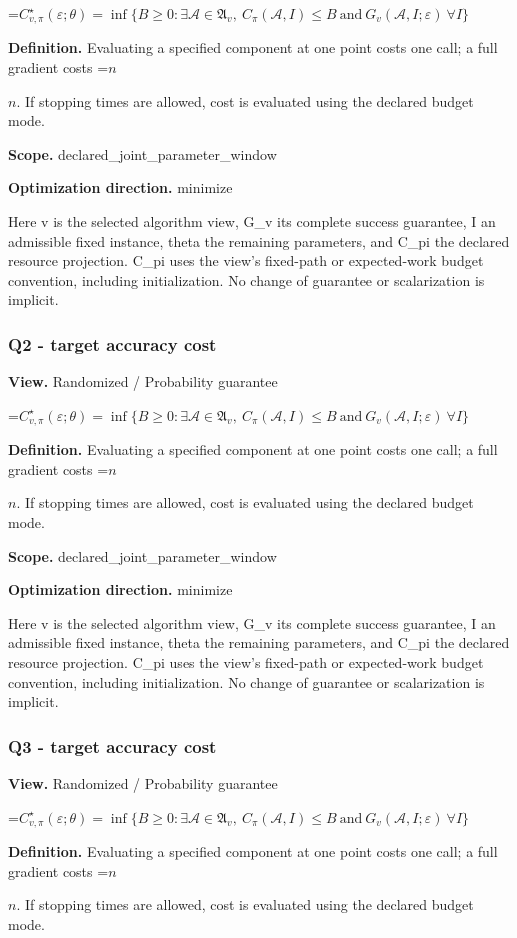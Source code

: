 \documentclass[10pt,a4paper]{article}
\newcommand{\AtlasMath}[1]{\par\begingroup\centering\setbox0=\hbox{$\displaystyle #1$}\ifdim\wd0>1.4\linewidth\typeout{ATLAS WIDE FORMULA: \the\wd0}\fi\ifdim\wd0>\linewidth\resizebox{\linewidth}{!}{\box0}\else\box0\fi\par\endgroup}
\newcommand{\AtlasInlineMath}[1]{\begingroup\setbox0=\hbox{$#1$}\ifdim\wd0>.4\linewidth\endgroup\AtlasMath{#1}\else\endgroup$#1$\fi}
\begin{document}
\AtlasMath{C^\star_{v,\pi}(\varepsilon;\theta)=\inf\{B\ge0:\exists\mathcal A\in\mathfrak A_v,\ C_\pi(\mathcal A,I)\le B\ \text{and}\ G_v(\mathcal A,I;\varepsilon)\ \forall I\}}
\textbf{Definition.} Evaluating a specified component at one point costs one call; a full gradient costs \AtlasInlineMath{n}. If stopping times are allowed, cost is evaluated using the declared budget mode.

\textbf{Scope.} declared\_joint\_parameter\_window

\textbf{Optimization direction.} minimize

Here v is the selected algorithm view, G\_v its complete success guarantee, I an admissible fixed instance, theta the remaining parameters, and C\_pi the declared resource projection. C\_pi uses the view's fixed-path or expected-work budget convention, including initialization. No change of guarantee or scalarization is implicit.

\subsubsection{Q2 - target accuracy cost}
\textbf{View.} Randomized / Probability guarantee

\AtlasMath{C^\star_{v,\pi}(\varepsilon;\theta)=\inf\{B\ge0:\exists\mathcal A\in\mathfrak A_v,\ C_\pi(\mathcal A,I)\le B\ \text{and}\ G_v(\mathcal A,I;\varepsilon)\ \forall I\}}
\textbf{Definition.} Evaluating a specified component at one point costs one call; a full gradient costs \AtlasInlineMath{n}. If stopping times are allowed, cost is evaluated using the declared budget mode.

\textbf{Scope.} declared\_joint\_parameter\_window

\textbf{Optimization direction.} minimize

Here v is the selected algorithm view, G\_v its complete success guarantee, I an admissible fixed instance, theta the remaining parameters, and C\_pi the declared resource projection. C\_pi uses the view's fixed-path or expected-work budget convention, including initialization. No change of guarantee or scalarization is implicit.

\subsubsection{Q3 - target accuracy cost}
\textbf{View.} Randomized / Probability guarantee

\AtlasMath{C^\star_{v,\pi}(\varepsilon;\theta)=\inf\{B\ge0:\exists\mathcal A\in\mathfrak A_v,\ C_\pi(\mathcal A,I)\le B\ \text{and}\ G_v(\mathcal A,I;\varepsilon)\ \forall I\}}
\textbf{Definition.} Evaluating a specified component at one point costs one call; a full gradient costs \AtlasInlineMath{n}. If stopping times are allowed, cost is evaluated using the declared budget mode.
\end{document}
